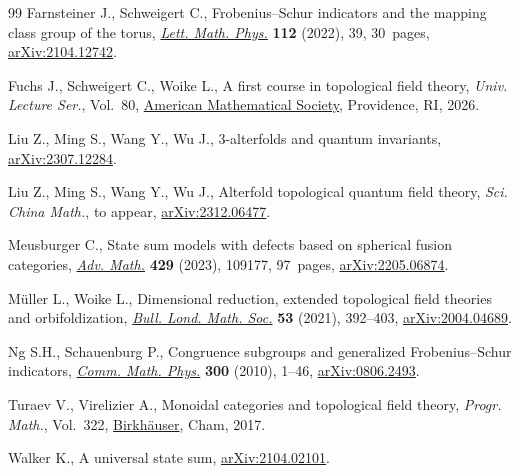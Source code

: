 \documentclass[10pt,a4paper]{amsart}
\numberwithin{equation}{section}
\theoremstyle{definition}
\begin{document}
\begin{thebibliography}{99}
Farnsteiner J., Schweigert C., Frobenius--{S}chur indicators and the mapping
 class group of the torus,
 \href{https://doi.org/10.1007/s11005-022-01513-6}{\textit{Lett. Math. Phys.}}
 \textbf{112} (2022), 39, 30~pages,
 \href{http://arxiv.org/abs/2104.12742}{arXiv:2104.12742}.

Fuchs J., Schweigert C., Woike L., A first course in topological field theory,
 \textit{Univ. Lecture Ser.}, Vol.~80,
 \href{https://doi.org/10.1090/ulect/080}{American Mathematical Society},
 Providence, RI, 2026.

Liu Z., Ming S., Wang Y., Wu J., 3-alterfolds and quantum invariants,
 \href{http://arxiv.org/abs/2307.12284}{arXiv:2307.12284}.

Liu Z., Ming S., Wang Y., Wu J., Alterfold topological quantum field theory,
 \textit{Sci. China Math.}, {t}o appear,
 \href{http://arxiv.org/abs/2312.06477}{arXiv:2312.06477}.

Meusburger C., State sum models with defects based on spherical fusion
 categories, \href{https://doi.org/10.1016/j.aim.2023.109177}{\textit{Adv.
 Math.}} \textbf{429} (2023), 109177, 97~pages,
 \href{http://arxiv.org/abs/2205.06874}{arXiv:2205.06874}.

M\"uller L., Woike L., Dimensional reduction, extended topological field
 theories and orbifoldization,
 \href{https://doi.org/10.1112/blms.12427}{\textit{Bull. Lond. Math. Soc.}}
 \textbf{53} (2021), 392--403,
 \href{http://arxiv.org/abs/2004.04689}{arXiv:2004.04689}.

Ng S.H., Schauenburg P., Congruence subgroups and generalized
 {F}robenius--{S}chur indicators,
 \href{https://doi.org/10.1007/s00220-010-1096-6}{\textit{Comm. Math. Phys.}}
 \textbf{300} (2010), 1--46,
 \href{http://arxiv.org/abs/0806.2493}{arXiv:0806.2493}.

Turaev V., Virelizier A., Monoidal categories and topological field theory,
 \textit{Progr. Math.}, Vol.~322,
 \href{https://doi.org/10.1007/978-3-319-49834-8}{Birkh\"auser}, Cham, 2017.

Walker K., A universal state sum,
 \href{http://arxiv.org/abs/2104.02101}{arXiv:2104.02101}.

\end{thebibliography}
\end{document}
